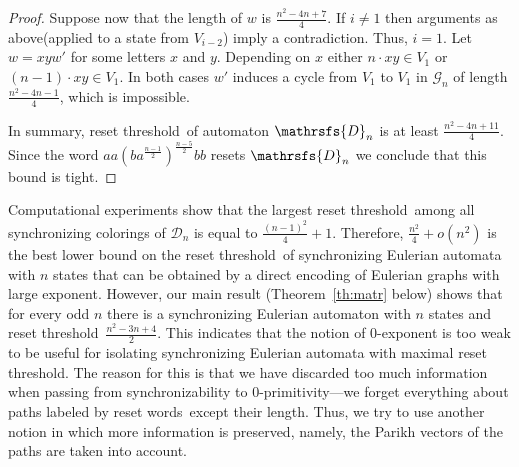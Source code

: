 \documentclass[12pt,twoside]{article}
\newcommand{\sws}{reset words}
\newcommand{\reth}{reset threshold}
\begin{document}
\begin{proof}
Suppose now that the length of $w$ is $\frac{n^2 -4n + 7}{4}$. If $i \neq 1$ then arguments as above(applied to
a state from $V_{i - 2}$) imply a contradiction. Thus, $i = 1$. Let $w = xyw'$ for some letters $x$ and $y$.
Depending on $x$ either $n \cdot xy  \in V_1$ or $(n - 1) \cdot xy \in V_1$. In both cases $w'$ induces a cycle from $V_1$ to $V_1$
in $\mathcal{G}_n$ of length $\frac{n^2 -4n - 1}{4}$, which is impossible.

In summary, \reth\ of automaton $\mathrsfs{D}_n$ is at least $\frac{n^2 -4n + 11}{4}$. Since the word
$aa(ba^{\frac{n - 1}{2}})^\frac{n - 5}{2}bb$ resets $\mathrsfs{D}_n$ we conclude that this bound is tight.

\end{proof}

Computational experiments show that the largest \reth\ among all synchronizing
colorings of $\mathcal{D}_n$ is equal to $\frac{(n - 1)^2}{4} + 1$. Therefore,
$\frac{n^2}{4} + o(n^2)$ is the best lower bound on the \reth\ of synchronizing
Eulerian automata with $n$ states that can be obtained by a direct encoding of
Eulerian graphs with large exponent. However, our main result
(Theorem~\ref{th:matr} below) shows that for every odd $n$ there is a
synchronizing Eulerian automaton with $n$ states and \reth\ $\frac{n^2 -3n +
4}{2}$. This indicates that the notion of 0-exponent is too weak to be useful
for isolating synchronizing Eulerian automata with maximal \reth. The reason
for this is that we have discarded too much information when passing from
synchronizability to 0-primitivity---we forget everything about paths labeled
by \sws\ except their length. Thus, we try to use another notion in which more
information is preserved, namely, the Parikh vectors of the paths are taken
into account.
\end{document}
